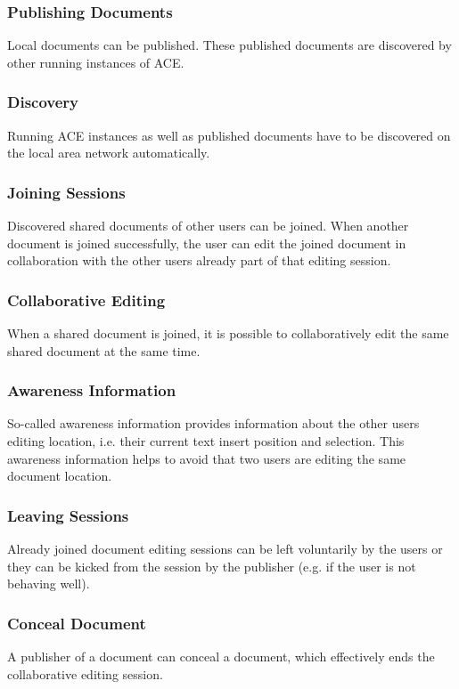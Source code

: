 \documentclass[11pt,a4paper]{article}
\begin{document}
\subsubsection{Publishing Documents}
Local documents can be published. These published documents are discovered by other
running instances of ACE.

\subsubsection{Discovery}
Running ACE instances as well as published documents have to be discovered on the local
area network automatically.

\subsubsection{Joining Sessions}
Discovered shared documents of other users can be joined. When another document is
joined successfully, the user can edit the joined document in collaboration with the
other users already part of that editing session.

\subsubsection{Collaborative Editing}
When a shared document is joined, it is possible to collaboratively edit the 
same shared document at the same time. 

\subsubsection{Awareness Information}
So-called awareness information provides information about the other users editing location, 
i.e. their current text insert position and selection. This awareness information
helps to avoid that two users are editing the same document location.

\subsubsection{Leaving Sessions}
Already joined document editing sessions can be left voluntarily by the users or they
can be kicked from the session by the publisher (e.g. if the user is not behaving well).

\subsubsection{Conceal Document}
A publisher of a document can conceal a document, which effectively ends the collaborative 
editing session. 
\end{document}
